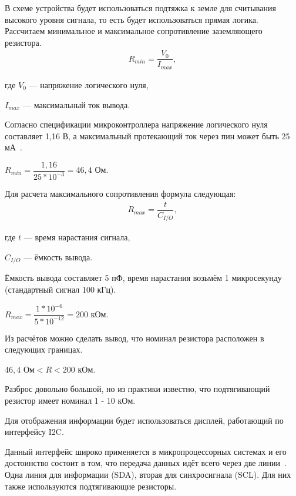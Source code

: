 	В схеме устройства будет использоваться подтяжка к земле для считывания высокого уровня сигнала, то есть будет использоваться прямая логика. Рассчитаем минимальное и максимальное сопротивление заземляющего резистора.
	\begin{gather}
	R_{min} = \dfrac{V_{0}}{I_{max}},
	\end{gather}
	
	где $V_{0}$ --- напряжение логического нуля,
	
	$I_{max}$ --- максимальный ток вывода.
	
	Согласно спецификации микроконтроллера напряжение логического нуля составляет 1,16 В, а максимальный протекающий ток через пин может быть 25 мА~\cite{f103}. 
	
\begin{center}
	$R_{min} = \dfrac{1,16}{25*10^{-3}} = 46,4$ Ом.
\end{center}

	Для расчета максимального сопротивления формула следующая:
	\begin{gather}
	R_{max} = \dfrac{t}{C_{I/O}},
	\end{gather}
	
	где $t$ --- время нарастания сигнала,
	
	$C_{I/O}$ --- ёмкость вывода.
	
	Ёмкость вывода составляет 5 пФ, время нарастания возьмём 1 микросекунду (стандартный сигнал 100 кГц).
	
\begin{center}
	$R_{max} = \dfrac{1*10^{-6}}{5*10^{-12}} = 200$ кОм.
\end{center}	

	Из расчётов можно сделать вывод, что номинал резистора расположен в следующих границах.
	
\begin{center}
	$46,4$ Ом$ < R < 200$ кОм.
\end{center}	

	Разброс довольно большой, но из практики известно, что подтягивающий резистор имеет номинал 1 - 10 кОм.
	
	Для отображения информации будет использоваться дисплей, работающий по интерфейсу I2C.	
	
	Данный интерфейс широко применяется в микропроцессорных системах и его достоинство состоит в том, что передача данных идёт всего через две линии~\cite{schemat}. Одна линия для информации (SDA), вторая для синхросигнала (SCL). Для них также используются подтягивающие резисторы.
	
